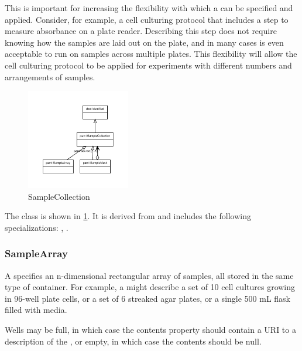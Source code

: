          This is important for increasing the flexibility with which a  can be specified and applied.
         Consider, for example, a cell culturing protocol that includes a step to measure  absorbance on a plate
         reader. Describing this step does not require knowing how the samples are laid out on the plate, and in many
         cases is even acceptable to run on samples across multiple plates. This flexibility will allow the cell
         culturing protocol to be applied for experiments with different numbers and arrangements of samples.%
\newline%
\linebreak%


\begin{figure}[h!]%
\centering%
\includegraphics[width=0.40212765957446805\textwidth]{paml_classes/SampleCollection_abstraction_hierarchy.pdf}%
\caption{SampleCollection}%
\label{fig:SampleCollection}%
\end{figure}

%
The  class is shown in \ref{fig:SampleCollection}. It is derived from  and includes the following specializations: , . %
%
\subsubsection{SampleArray}%
\label{sec:paml:SampleArray}%
A  specifies an n-dimensional rectangular array of samples, all stored in the same
        type of container. For example, a  might describe a set of 10 cell cultures growing in
        96-well plate cells, or a set of 6 streaked agar plates, or a single 500 mL flask filled with media.

        Wells may be full, in which case the contents property should contain a URI to a description of the ,
        or empty, in which case the contents should be null.

